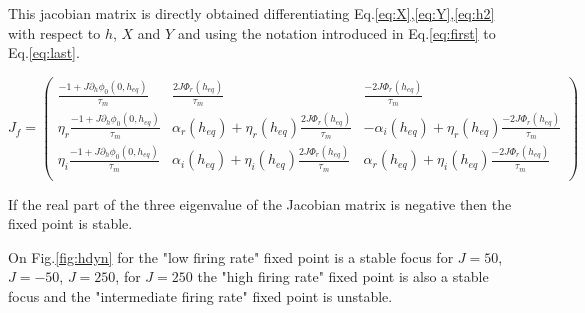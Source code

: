 \documentclass[12pt,twoside]{report}
\begin{document}
This jacobian matrix is directly obtained differentiating  Eq.\eqref{eq:X},\eqref{eq:Y},\eqref{eq:h2} with respect to $h$, $X$ and $Y$ and using the notation introduced in Eq.\eqref{eq:first} to Eq.\eqref{eq:last}.

\begin{equation}
J_f=
\begin{pmatrix}
\frac{-1+J\partial_h\phi_0(0,h_{eq})}{\tau_m} & \frac{2J\Phi_r(h_{eq})}{\tau_m} & \frac{-2J\Phi_r(h_{eq})}{\tau_m}  \\
\eta_r\frac{-1+J\partial_h\phi_0(0,h_{eq})}{\tau_m} &\alpha_r(h_{eq})+\eta_r(h_{eq}) \frac{2J\Phi_r(h_{eq})}{\tau_m} & -\alpha_i(h_{eq})+\eta_r(h_{eq})\frac{-2J\Phi_r(h_{eq})}{\tau_m}  \\
\eta_i\frac{-1+J\partial_h\phi_0(0,h_{eq})}{\tau_m} &\alpha_i(h_{eq})+\eta_i(h_{eq}) \frac{2J\Phi_r(h_{eq})}{\tau_m} & \alpha_r(h_{eq})+\eta_i(h_{eq})\frac{-2J\Phi_r(h_{eq})}{\tau_m}  \\
\end{pmatrix}
\end{equation}

If the real part of the three eigenvalue of the Jacobian matrix is negative then the fixed point is stable.

On Fig.\ref{fig:hdyn} for the "low firing rate" fixed point is a stable focus for $J=50$,$J=-50$, $J=250$, for $J=250$ the "high firing rate" fixed point is also a stable focus and the "intermediate firing rate" fixed point is unstable.





\clearpage

%

%
%
%
%

\renewcommand{\bibname}{References} %

\nocite{GerKis14,WilCow72,GerKis02,KniMan96,MatGiu02,Mat16_arxiv,SchOst13,Sch13,DayAbb05,Ris84,Vre10,OstBru11,AugLad17,Prij93,Lef09,KanSch00,Kni72,Ger00,ChiGra07,ChiGra08,SchDeg17}






\end{document}

